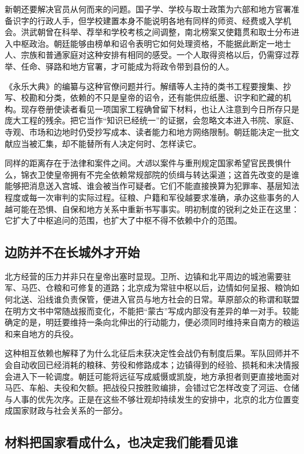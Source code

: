 新朝还要解决官员从何而来的问题。国子学、学校与取士政策为六部和地方官署准备识字的行政人手，但学校建置本身不能说明各地有同样的师资、经费或入学机会。洪武朝曾在科举、荐举和学校考核之间调整，南北榜案又使籍贯和取士分布进入中枢政治。朝廷能够由榜单和诏令表明它如何处理资格，不能据此断定一地士人、宗族和普通家庭对这种安排有相同的感受。一个人取得资格以后，仍需穿过荐举、任命、驿路和地方官署，才可能成为将政令带到县份的人。

《永乐大典》的编纂与这种官僚问题并行。解缙等人主持的类书工程要搜集、抄写、校勘和分类，依赖的不只是皇帝的诏令，还有能供应纸墨、识字和贮藏的机构。现存卷册使读者看见一项国家工程确曾留下材料，也让人注意到今日所存只是庞大工程的残余。把它当作“知识已经统一”的证据，会忽略文本进入书院、家庭、寺观、市场和边地时仍受抄写成本、读者能力和地方网络限制。朝廷能决定一批文献应当被汇集，却不能替所有人决定何时、怎样读它。

同样的距离存在于法律和案件之间。\textit{大诰}以案件与重刑规定国家希望官民畏惧什么，锦衣卫使皇帝拥有不完全依赖常规部院的侦缉与转达渠道；这首先改变的是谁能够把消息送入宫城、谁会被当作可疑者。它们不能直接换算为犯罪率、基层知法程度或每一次审判的实际过程。征粮、户籍和军役越要求准确，承办这些事务的人越可能在恐惧、自保和地方关系中重新书写事实。明初制度的锐利之处正在这里：它扩大了中枢追问的范围，也扩大了中枢不得不依赖中介的范围。

\subsection{边防并不在长城外才开始}

北方经营的压力并非只在皇帝出塞时显现。卫所、边镇和北平周边的城池需要驻军、马匹、仓粮和可修复的道路；北京成为常驻中枢以后，边情如何呈报、粮饷如何北送、沿线谁负责保管，便进入官员与地方社会的日常。草原部众的称谓和联盟在明方文书中常随战报而变化，不能把“蒙古”写成内部没有差异的单一对手。较能确定的是，明廷要维持一条向北伸出的行动能力，便必须同时维持来自南方的粮运和来自地方的兵役。

这种相互依赖也解释了为什么北征后未获决定性会战仍有制度后果。军队回师并不会自动收回已经消耗的粮秣、劳役和修路成本；边镇得到的经验、损耗和未决情报会进入下一轮调度。朝廷可能将远征写成威慑或凯旋，地方承担者则更直接地面对马匹、车船、夫役和欠额。把战役只按胜败编排，会错过它怎样改变了河运、仓储与人事的优先次序。正是在这些不够壮观却持续发生的安排中，北京的北方位置变成国家财政与社会关系的一部分。

\subsection{材料把国家看成什么，也决定我们能看见谁}

